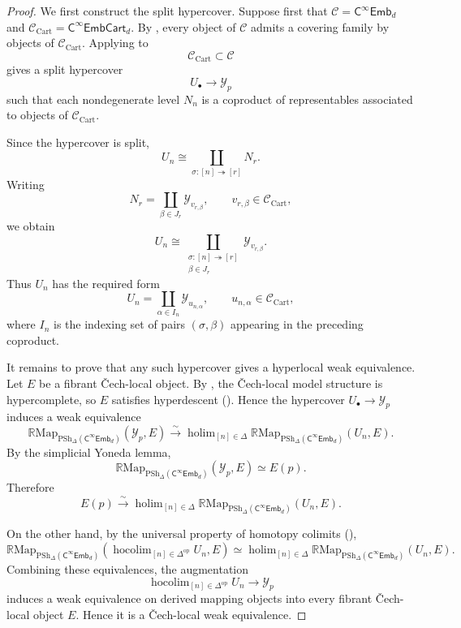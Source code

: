 \documentclass{amsart}
\newcommand{\cat}[1]{\mathsf{#1}}
\DeclareMathOperator*{\holim}{holim}
\DeclareMathOperator*{\hocolim}{hocolim}
\newcommand{\fembnoniso}[1]{\cat{C}^{\infty}\cat{Emb}_{#1}}
\newcommand{\fembcartnoniso}[1]{\cat{C}^{\infty}\cat{EmbCart}_{#1}}
\newcommand{\Map}{\mathrm{Map}}
\newcommand{\spsh}{\mathrm{PSh}_{\Delta}}
\newcommand{\RR}{{\mathbb{R}}}
\renewcommand{\op}{\mathrm{op}}
\newcommand{\Yo}{\mathscr{Y}}
\theoremstyle{definition}
\numberwithin{equation}{subsection}
\numberwithin{subsubsection}{subsection}
\begin{document}
\begin{proof}
  We first construct the split hypercover. Suppose first that
  \(\mathcal{C}=\fembnoniso{d}\) and
  \(\mathcal{C}_{\mathrm{Cart}}=\fembcartnoniso{d}\). By
  , every object of \(\mathcal{C}\) admits
  a covering family by objects of \(\mathcal{C}_{\mathrm{Cart}}\). Applying
   to
  \[
    \mathcal{C}_{\mathrm{Cart}}\subset\mathcal{C}
  \]
  gives a split hypercover
  \[
    U_\bullet\longrightarrow\Yo_p
  \]
  such that each nondegenerate level \(N_n\) is a coproduct of
  representables associated to objects of \(\mathcal{C}_{\mathrm{Cart}}\).

  Since the hypercover is split,
  \[
    U_n\cong
    \coprod_{\sigma:[n]\twoheadrightarrow[r]}N_r .
  \]
  Writing
  \[
    N_r=\coprod_{\beta\in J_r}\Yo_{v_{r,\beta}},
    \qquad v_{r,\beta}\in\mathcal{C}_{\mathrm{Cart}},
  \]
  we obtain
  \[
    U_n\cong
    \coprod_{\substack{\sigma:[n]\twoheadrightarrow[r]\\ \beta\in J_r}}
    \Yo_{v_{r,\beta}} .
  \]
  Thus \(U_n\) has the required form
  \[
    U_n=\coprod_{\alpha\in I_n}\Yo_{u_{n,\alpha}},
    \qquad
    u_{n,\alpha}\in\mathcal{C}_{\mathrm{Cart}},
  \]
  where \(I_n\) is the indexing set of pairs
  \((\sigma,\beta)\) appearing in the preceding coproduct.

  It remains to prove that any such hypercover gives a hyperlocal weak
  equivalence. Let \(E\) be a fibrant \v{C}ech-local object. By
  , the \v{C}ech-local model
  structure is hypercomplete, so \(E\) satisfies hyperdescent
  (). Hence the
  hypercover \(U_\bullet\to\Yo_p\) induces a weak equivalence
  \[
    \RR\Map_{\spsh(\fembnoniso{d})}(\Yo_p,E)
    \xrightarrow{\sim}
    \holim_{[n]\in\Delta}
    \RR\Map_{\spsh(\fembnoniso{d})}(U_n,E).
  \]
  By the simplicial Yoneda lemma,
  \[
    \RR\Map_{\spsh(\fembnoniso{d})}(\Yo_p,E)
    \simeq E(p).
  \]
  Therefore
  \[
    E(p)
    \xrightarrow{\sim}
    \holim_{[n]\in\Delta}
    \RR\Map_{\spsh(\fembnoniso{d})}(U_n,E).
  \]

  On the other hand, by the universal property of homotopy colimits
  (),
  \[
    \RR\Map_{\spsh(\fembnoniso{d})}
    \left(
      \hocolim_{[n]\in\Delta^{\op}}U_n,
      E
    \right)
    \simeq
    \holim_{[n]\in\Delta}
    \RR\Map_{\spsh(\fembnoniso{d})}(U_n,E).
  \]
  Combining these equivalences, the augmentation
  \begin{equation}\label{eq:unenriched.aug}
    \hocolim_{[n]\in\Delta^{\op}}U_n
    \longrightarrow
    \Yo_p
  \end{equation}
  induces a weak equivalence on derived mapping objects into every fibrant
  \v{C}ech-local object \(E\). Hence it is a \v{C}ech-local weak
  equivalence.


\end{proof}
\end{document}
